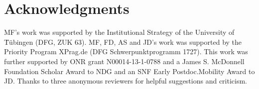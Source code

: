 \documentclass[10pt,letterpaper]{article}
\begin{document}
\section{Acknowledgments}

MF's work was supported by the Institutional Strategy of the University of T̈\"{u}bingen
(DFG, ZUK 63). MF, FD, AS and JD's work was supported by the
Priority Program XPrag.de (DFG Schwerpunktprogramm 1727). This work was further supported by
ONR grant N00014-13-1-0788 and a James S. McDonnell Foundation Scholar Award to NDG and an SNF
Early Postdoc.Mobility Award to JD. Thanks to three anonymous reviewers for helpful suggestions
and criticism.





\setlength{\bibleftmargin}{.125in}
\setlength{\bibindent}{-\bibleftmargin}


\end{document}
